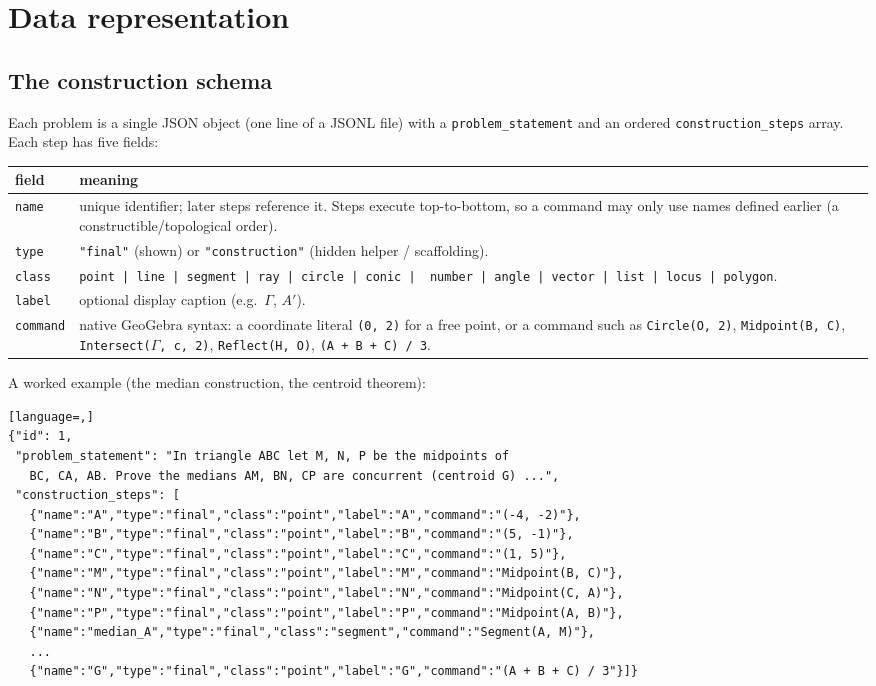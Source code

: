 \documentclass[11pt]{article}
\newcommand{\code}[1]{\texttt{\small #1}}
\begin{document}
\section{Data representation}

\subsection{The construction schema}
Each problem is a single JSON object (one line of a JSONL file) with a
\code{problem\_statement} and an ordered \code{construction\_steps} array. Each
step has five fields:

\begin{center}
\begin{tabular}{@{}lp{11.4cm}@{}}
\toprule
\textbf{field} & \textbf{meaning}\\
\midrule
\code{name}    & unique identifier; later steps reference it. Steps execute
                 top-to-bottom, so a command may only use names defined earlier
                 (a constructible/topological order).\\
\code{type}    & \code{"final"} (shown) or \code{"construction"} (hidden helper /
                 scaffolding).\\
\code{class}   & \code{point\,|\,line\,|\,segment\,|\,ray\,|\,circle\,|\,conic\,|\,
                 number\,|\,angle\,|\,vector\,|\,list\,|\,locus\,|\,polygon}.\\
\code{label}   & optional display caption (e.g.\ $\Gamma$, $A'$).\\
\code{command} & native GeoGebra syntax: a coordinate literal \code{(0, 2)} for a
                 free point, or a command such as \code{Circle(O, 2)},
                 \code{Midpoint(B, C)}, \code{Intersect($\Gamma$, c, 2)},
                 \code{Reflect(H, O)}, \code{(A + B + C) / 3}.\\
\bottomrule
\end{tabular}
\end{center}

A worked example (the median construction, the centroid theorem):

\begin{lstlisting}[language=,]
{"id": 1,
 "problem_statement": "In triangle ABC let M, N, P be the midpoints of
   BC, CA, AB. Prove the medians AM, BN, CP are concurrent (centroid G) ...",
 "construction_steps": [
   {"name":"A","type":"final","class":"point","label":"A","command":"(-4, -2)"},
   {"name":"B","type":"final","class":"point","label":"B","command":"(5, -1)"},
   {"name":"C","type":"final","class":"point","label":"C","command":"(1, 5)"},
   {"name":"M","type":"final","class":"point","label":"M","command":"Midpoint(B, C)"},
   {"name":"N","type":"final","class":"point","label":"N","command":"Midpoint(C, A)"},
   {"name":"P","type":"final","class":"point","label":"P","command":"Midpoint(A, B)"},
   {"name":"median_A","type":"final","class":"segment","command":"Segment(A, M)"},
   ...
   {"name":"G","type":"final","class":"point","label":"G","command":"(A + B + C) / 3"}]}
\end{lstlisting}
\end{document}
